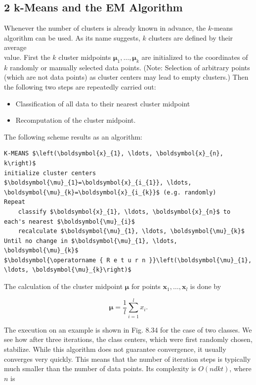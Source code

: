 \documentclass[10pt]{article}
\begin{document}
\subsection*{2 k-Means and the EM Algorithm}
Whenever the number of clusters is already known in advance, the $k$-means algorithm can be used. As its name suggests, $k$ clusters are defined by their average\\
value. First the $k$ cluster midpoints $\boldsymbol{\mu}_{1}, \ldots, \boldsymbol{\mu}_{k}$ are initialized to the coordinates of $k$ randomly or manually selected data points. (Note: Selection of arbitrary points (which are not data points) as cluster centers may lead to empty clusters.) Then the following two steps are repeatedly carried out:

\begin{itemize}
  \item Classification of all data to their nearest cluster midpoint
  \item Recomputation of the cluster midpoint.
\end{itemize}

The following scheme results as an algorithm:

\begin{verbatim}
K-MEANS $\left(\boldsymbol{x}_{1}, \ldots, \boldsymbol{x}_{n}, k\right)$
initialize cluster centers $\boldsymbol{\mu}_{1}=\boldsymbol{x}_{i_{1}}, \ldots, \boldsymbol{\mu}_{k}=\boldsymbol{x}_{i_{k}}$ (e.g. randomly)
Repeat
    classify $\boldsymbol{x}_{1}, \ldots, \boldsymbol{x}_{n}$ to each's nearest $\boldsymbol{\mu}_{i}$
    recalculate $\boldsymbol{\mu}_{1}, \ldots, \boldsymbol{\mu}_{k}$
Until no change in $\boldsymbol{\mu}_{1}, \ldots, \boldsymbol{\mu}_{k}$
$\boldsymbol{\operatorname { R e t u r n }}\left(\boldsymbol{\mu}_{1}, \ldots, \boldsymbol{\mu}_{k}\right)$
\end{verbatim}

The calculation of the cluster midpoint $\boldsymbol{\mu}$ for points $\boldsymbol{x}_{1}, \ldots, \boldsymbol{x}_{l}$ is done by

$$
\boldsymbol{\mu}=\frac{1}{l} \sum_{i=1}^{l} x_{i} .
$$

The execution on an example is shown in Fig. 8.34 for the case of two classes. We see how after three iterations, the class centers, which were first randomly chosen, stabilize. While this algorithm does not guarantee convergence, it usually converges very quickly. This means that the number of iteration steps is typically much smaller than the number of data points. Its complexity is $O(n d k t)$, where $n$ is
\end{document}
